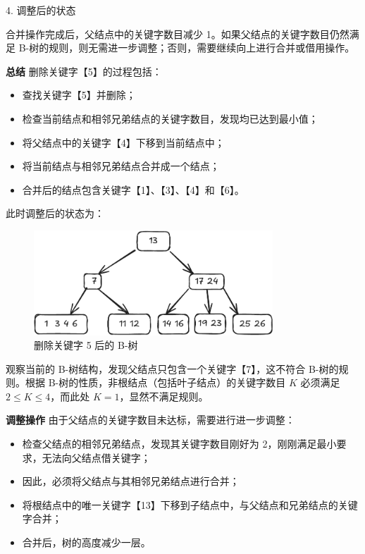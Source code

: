 \documentclass[lang=cn,newtx,10pt,scheme=chinese]{elegantbook}
\begin{document}
      4. 调整后的状态 

         合并操作完成后，父结点中的关键字数目减少 1。如果父结点的关键字数目仍然满足 B-树的规则，则无需进一步调整；否则，需要继续向上进行合并或借用操作。
      
      
      \textbf{总结}  
      删除关键字【5】的过程包括：
      \begin{itemize}
        \item 查找关键字【5】并删除；
        \item 检查当前结点和相邻兄弟结点的关键字数目，发现均已达到最小值；
        \item 将父结点中的关键字【4】下移到当前结点中；
        \item 将当前结点与相邻兄弟结点合并成一个结点；
        \item 合并后的结点包含关键字【1】、【3】、【4】和【6】。
      \end{itemize}

      此时调整后的状态为：
      \begin{figure}[h!]
          \centering
          \includegraphics[width=0.8\textwidth]{./figure/pdf/cropped/Btree_del5.pdf}
          \caption{删除关键字 5 后的 B-树}
          \label{fig:Btree_delete_5}

      \end{figure}

观察当前的 B-树结构，发现父结点只包含一个关键字【7】，这不符合 B-树的规则。根据 B-树的性质，非根结点（包括叶子结点）的关键字数目 $K$ 必须满足 $2 \leq K \leq 4$，而此处 $K = 1$，显然不满足规则。


\textbf{调整操作}  
由于父结点的关键字数目未达标，需要进行进一步调整：
\begin{itemize}
  \item 检查父结点的相邻兄弟结点，发现其关键字数目刚好为 2，刚刚满足最小要求，无法向父结点借关键字；
  \item 因此，必须将父结点与其相邻兄弟结点进行合并；
  \item 将根结点中的唯一关键字【13】下移到子结点中，与父结点和兄弟结点的关键字合并；
  \item 合并后，树的高度减少一层。
\end{itemize}
\end{document}
